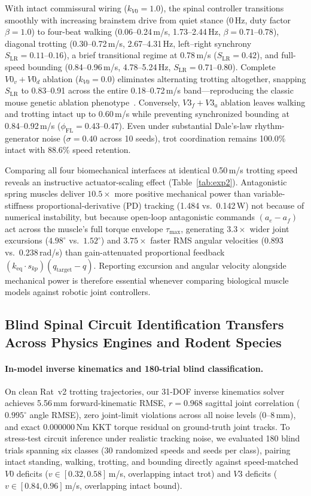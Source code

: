 \documentclass[10pt,twocolumn,letterpaper]{article}
\begin{document}
With intact commissural wiring ($k_{V0}=1.0$), the spinal controller transitions smoothly with increasing brainstem drive from quiet stance ($0$\,Hz, duty factor $\beta=1.0$) to four-beat walking (0.06--0.24\,m/s, 1.73--2.44\,Hz, $\beta=0.71\text{--}0.78$), diagonal trotting (0.30--0.72\,m/s, 2.67--4.31\,Hz, left--right synchrony $S_{\mathrm{LR}}=0.11\text{--}0.16$), a brief transitional regime at 0.78\,m/s ($S_{\mathrm{LR}}=0.42$), and full-speed bounding (0.84--0.96\,m/s, 4.78--5.24\,Hz, $S_{\mathrm{LR}}=0.71\text{--}0.80$). Complete $V0_v{+}V0_d$ ablation ($k_{V0}=0.0$) eliminates alternating trotting altogether, snapping $S_{\mathrm{LR}}$ to 0.83--0.91 across the entire 0.18--0.72\,m/s band---reproducing the classic mouse genetic ablation phenotype~\cite{bellardita2015v0}. Conversely, $V3_f{+}V3_a$ ablation leaves walking and trotting intact up to 0.60\,m/s while preventing synchronized bounding at 0.84--0.92\,m/s ($\phi_{\mathrm{FL}}=0.43\text{--}0.47$). Even under substantial Dale's-law rhythm-generator noise ($\sigma=0.40$ across 10 seeds), trot coordination remains 100.0\% intact with 88.6\% speed retention.

Comparing all four biomechanical interfaces at identical 0.50\,m/s trotting speed reveals an instructive actuator-scaling effect (Table~\ref{tab:exp2}). Antagonistic spring muscles deliver $10.5\times$ more positive mechanical power than variable-stiffness proportional-derivative (PD) tracking (1.484 vs.\ 0.142\,W) not because of numerical instability, but because open-loop antagonistic commands $(a_e - a_f)$ act across the muscle's full torque envelope $\tau_{\max}$, generating $3.3\times$ wider joint excursions ($4.98^\circ$ vs.\ $1.52^\circ$) and $3.75\times$ faster RMS angular velocities (0.893 vs.\ 0.238\,rad/s) than gain-attenuated proportional feedback $(k_{\mathrm{eq}}\cdot s_{kp})(q_{\mathrm{target}}-q)$. Reporting excursion and angular velocity alongside mechanical power is therefore essential whenever comparing biological muscle models against robotic joint controllers.

\subsection{Blind Spinal Circuit Identification Transfers Across Physics Engines and Rodent Species}

\paragraph{In-model inverse kinematics and 180-trial blind classification.}
On clean Rat~v2 trotting trajectories, our 31-DOF inverse kinematics solver achieves 5.56\,mm forward-kinematic RMSE, $r=0.968$ sagittal joint correlation ($0.995^\circ$ angle RMSE), zero joint-limit violations across all noise levels (0--8\,mm), and exact 0.000000\,Nm KKT torque residual on ground-truth joint tracks. To stress-test circuit inference under realistic tracking noise, we evaluated 180 blind trials spanning six classes (30 randomized speeds and seeds per class), pairing intact standing, walking, trotting, and bounding directly against speed-matched $V0$ deficits ($v \in [0.32, 0.58]$\,m/s, overlapping intact trot) and $V3$ deficits ($v \in [0.84, 0.96]$\,m/s, overlapping intact bound).
\end{document}
